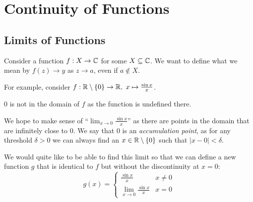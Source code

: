 \documentclass[../main.tex]{subfiles}
\begin{document}
\chapter{Continuity of Functions}
\section{Limits of Functions}
Consider a function $f: X \to \mathbb{C}$ for some $X \subseteq \mathbb{C}$.
We want to define what we mean by $f(z) \to y$ as $z \to a$, even if $a \notin X$.
\begin{example}
  For example, consider $f: \mathbb{R} \setminus \{0\} \to \mathbb{R},\ x \mapsto \frac{\sin x}{x}$.
  \begin{center}
  \end{center}
  $0$ is not in the domain of $f$ as the function is undefined there.

  We hope to make sense of ``$\lim_{x \to 0} \frac{\sin x}{x}$'' as there are points in the domain that are infinitely close to $0$.
  We say that 0 is an \textit{accumulation point}, as for any threshold $\delta > 0$ we can always find an $x \in \mathbb{R} \setminus \{0\}$ such that $|x - 0| < \delta$.

  We would quite like to be able to find this limit so that we can define a new function $g$ that is identical to $f$ but without the discontinuity at $x = 0$:
  \[
    g(x) = \begin{cases}
    \frac{\sin x}{x} & x \neq 0 \\
    \lim\limits_{x \to 0} \frac{\sin x}{x} & x = 0
    \end{cases}
  \]
\end{example}
\end{document}
